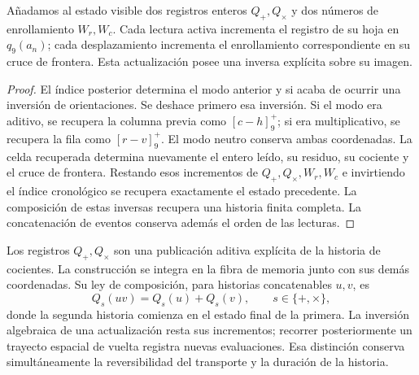 \begin{proposition}
\label{ii:ii:electron-inversa-cocientes}
Añadamos al estado visible dos registros enteros \(Q_+,Q_\times\)
y dos números de enrollamiento \(W_r,W_c\). Cada lectura activa
incrementa el registro de su hoja en \(q_9(a_n)\); cada desplazamiento
incrementa el enrollamiento correspondiente en su cruce de frontera.
Esta actualización posee una inversa explícita sobre su imagen.
\end{proposition}
\begin{proof}
El índice posterior determina el modo anterior y si acaba de ocurrir
una inversión de orientaciones. Se deshace primero esa inversión.
Si el modo era aditivo, se recupera la columna previa como
\([c-h]^+_9\); si era multiplicativo, se recupera la fila como
\([r-v]^+_9\). El modo neutro conserva ambas coordenadas. La celda
recuperada determina nuevamente el entero leído, su residuo, su
cociente y el cruce de frontera. Restando esos incrementos de
\(Q_+,Q_\times,W_r,W_c\) e invirtiendo el índice cronológico se
recupera exactamente el estado precedente. La composición de estas
inversas recupera una historia finita completa. La concatenación de
eventos conserva además el orden de las lecturas.
\end{proof}

Los registros \(Q_+,Q_\times\) son una publicación aditiva explícita
de la historia de cocientes. La construcción se integra en la fibra
de memoria junto con sus demás coordenadas. Su ley de composición,
para historias concatenables \(u,v\), es
\[
 Q_s(uv)=Q_s(u)+Q_s(v),\qquad s\in\{+,\times\},
\]
donde la segunda historia comienza en el estado final de la primera.
La inversión algebraica de una actualización resta sus incrementos;
recorrer posteriormente un trayecto espacial de vuelta registra
nuevas evaluaciones. Esa distinción conserva simultáneamente la
reversibilidad del transporte y la duración de la historia.


